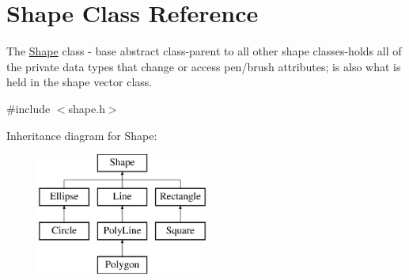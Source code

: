 \hypertarget{class_shape}{}\section{Shape Class Reference}
\label{class_shape}


The \hyperlink{class_shape}{Shape} class -\/ base abstract class-\/parent to all other shape classes-\/holds all of the private data types that change or access pen/brush attributes; is also what is held in the shape vector class.  




{\ttfamily \#include $<$shape.\+h$>$}

Inheritance diagram for Shape\+:\begin{figure}[H]
\begin{center}
\leavevmode
\includegraphics[height=4.000000cm]{class_shape}
\end{center}
\end{figure}
